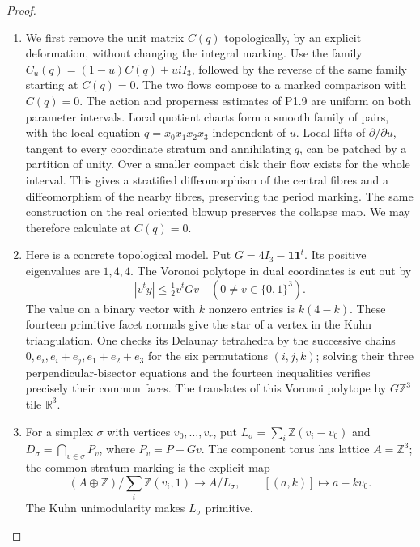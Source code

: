 \begin{proof}
\begin{enumerate}[label=\arabic*.]
\item We first remove the unit matrix $C(q)$ topologically, by an explicit
deformation, without changing the integral marking.  Use the family
$C_u(q)=(1-u)C(q)+u iI_3$, followed by the reverse of the same
family starting at $C(q)=0$.  The two flows compose to a marked
comparison with $C(q)=0$.  The action and properness estimates
of P1.9 are uniform on both parameter intervals.  Local quotient charts form a smooth
family of pairs, with the local equation $q=x_0x_1x_2x_3$ independent
of $u$.  Local lifts of $\partial/\partial u$, tangent to every
coordinate stratum and annihilating $q$, can be patched by a partition
of unity.  Over a smaller compact disk their flow exists for the whole
interval.  This gives a stratified diffeomorphism of the central
fibres and a diffeomorphism of the nearby fibres, preserving the
period marking.  The same construction on the real oriented blowup
preserves the collapse map.  We may therefore calculate at $C(q)=0$.

\item Here is a concrete topological model.  Put $G=4I_3-\mathbf1\mathbf1^t$.
Its positive eigenvalues are $1,4,4$.  The Voronoi polytope in dual
coordinates is cut out by
\[
|v^ty|\leq \tfrac12v^tGv
 \quad (0\ne v\in\{0,1\}^3).
\]
The value on a binary vector with $k$ nonzero entries is $k(4-k)$.
These fourteen primitive facet normals give the star of a vertex in
the Kuhn triangulation.  One checks its Delaunay tetrahedra by the
successive chains
$0,e_i,e_i+e_j,e_1+e_2+e_3$ for the six permutations $(i,j,k)$;
solving their three perpendicular-bisector equations and the fourteen
inequalities verifies precisely their common faces.  The translates
of this Voronoi polytope by $G\mathbb Z^3$ tile $\mathbb R^3$.

\item For a simplex $\sigma$ with vertices $v_0,\ldots,v_r$, put
$L_\sigma=\sum_i\mathbb Z(v_i-v_0)$ and
$D_\sigma=\bigcap_{v\in\sigma}P_v$, where $P_v=P+Gv$.
The component torus has lattice $A=\mathbb Z^3$; the common-stratum
marking is the explicit map
\[
 (A\oplus\mathbb Z)/\sum_i\mathbb Z(v_i,1)
 \longrightarrow A/L_\sigma,\qquad
 [(a,k)]\longmapsto a-kv_0.
\]
The Kuhn unimodularity makes $L_\sigma$ primitive.


\end{enumerate}
\end{proof}
